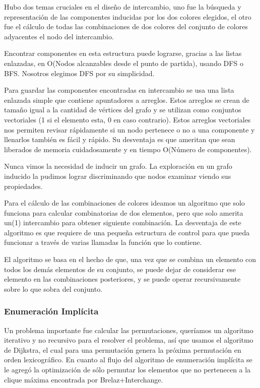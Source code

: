 \documentclass[a4paper,10pt]{article}
\begin{document}
Hubo dos temas cruciales en el diseño de intercambio, uno fue la búsqueda y representación de las componentes inducidas por los dos colores elegidos, el otro fue el cálculo de todas las combinaciones de dos colores del conjunto de colores adyacentes el nodo del intercambio.

Encontrar componentes en esta estructura puede lograrse, gracias a las listas enlazadas, en O(Nodos alcanzables desde el punto de partida), usando DFS o BFS. Nosotros elegimos DFS por su simplicidad.

Para guardar las componentes encontradas en intercambio se usa una lista enlazada simple que contiene apuntadores a arreglos. Estos arreglos se crean de tamaño igual a la cantidad de vértices del grafo y se utilizan como conjuntos vectoriales (1 si el elemento esta, 0 en caso contrario). Estos arreglos vectoriales nos permiten revisar rápidamente si un nodo pertenece o no a una componente y llenarlos también es fácil y rápido. Su desventaja es que ameritan que sean liberados de memoria cuidadosamente y en tiempo O(Número de componentes).

Nunca vimos la necesidad de inducir un grafo. La exploración en un grafo inducido la pudimos lograr discriminando que nodos examinar viendo sus propiedades.

Para el cálculo de las combinaciones de colores ideamos un algoritmo que solo funciona para calcular combinatorias de dos elementos, pero que solo amerita un(1) intercambio para obtener siguiente combinación. La desventaja de este algoritmo es que requiere de una pequeña estructura de control para que pueda funcionar a través de varias llamadas la función que lo contiene.

El algoritmo se basa en el hecho de que, una vez que se combina un elemento con todos los demás elementos de su conjunto, se puede dejar de considerar ese elemento en las combinaciones posteriores, y se puede operar recursivamente sobre lo que sobra del conjunto.

\subsubsection{Enumeración Implícita}
Un problema importante fue calcular las permutaciones, queríamos un algoritmo iterativo y no recursivo para el resolver el problema, así que usamos el algoritmo de Dijkstra, el cual para una permutación genera la próxima permutación en orden lexicográfico.
En cuanto al flujo del algoritmo de enumeración implícita se le agregó la optimización de sólo permutar los elementos que no pertenecen a la clique máxima encontrada por Brelaz+Interchange.
\newpage
\end{document}
